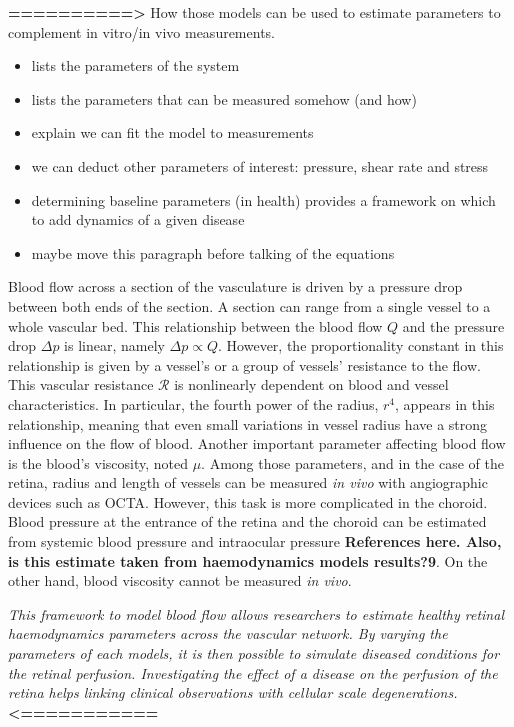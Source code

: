 \documentclass[12pt,a4paper]{journal}
\begin{document}
\textbf{==========>}
How those models can be used to estimate parameters to complement in vitro/in vivo measurements.
\begin{itemize}
\item lists the parameters of the system
\item lists the parameters that can be measured somehow (and how)
\item explain we can fit the model to measurements
\item we can deduct other parameters of interest: pressure, shear rate and stress
\item determining baseline parameters (in health) provides a framework on which to add dynamics of a given disease
\item maybe move this paragraph before talking of the equations
\end{itemize}

Blood flow across a section of the vasculature is driven by a pressure drop between both ends of the section.
A section can range from a single vessel to a whole vascular bed.
This relationship between the blood flow $Q$ and the pressure drop $\Delta p$ is linear, namely $\Delta p\propto Q$.
However, the proportionality constant in this relationship is given by a vessel's or a group of vessels' resistance to the flow.
This vascular resistance $\mathcal{R}$ is nonlinearly dependent on blood and vessel characteristics.
In particular, the fourth power of the radius, $r^4$, appears in this relationship, meaning that even small variations in vessel radius have a strong influence on the flow of blood.
Another important parameter affecting blood flow is the blood's viscosity, noted $\mu$.
Among those parameters, and in the case of the retina, radius and length of vessels can be measured \textit{in vivo} with angiographic devices such as OCTA.
However, this task is more complicated in the choroid.
Blood pressure at the entrance of the retina and the choroid can be estimated from systemic blood pressure and intraocular pressure \textbf{References here. Also, is this estimate taken from haemodynamics models results?9}. 
On the other hand, blood viscosity cannot be measured \textit{in vivo}.



\textit{This framework to model blood flow allows researchers to estimate healthy retinal haemodynamics parameters across the vascular network.
By varying the parameters of each models, it is then possible to simulate diseased conditions for the retinal perfusion.
Investigating the effect of a disease on the perfusion of the retina helps linking clinical observations with cellular scale degenerations.}
\textbf{\\<===========}
\end{document}
